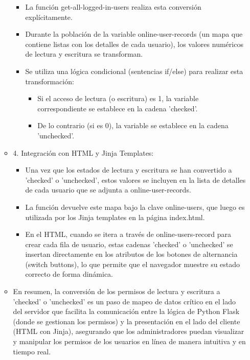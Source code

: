 \documentclass{report}
\begin{document}
\begin{itemize}
\begin{itemize}
\begin{itemize}
                \item La función get-all-logged-in-users realiza esta conversión explícitamente.
                \item Durante la población de la variable online-user-records (un mapa que contiene listas con los detalles de cada usuario), los valores 
                numéricos de lectura y escritura se transforman.
                \item Se utiliza una lógica condicional (sentencias if/else) para realizar esta transformación:
                    \begin{itemize}
                        \item Si el acceso de lectura (o escritura) es 1, la variable correspondiente se establece en la cadena 'checked'.
                        \item De lo contrario (si es 0), la variable se establece en la cadena 'unchecked'.
                    \end{itemize}
            \end{itemize}
        \item 4. Integración con HTML y Jinja Templates:
            \begin{itemize}
                \item Una vez que los estados de lectura y escritura se han convertido a 'checked' o 'unchecked', estos valores se incluyen en la lista de 
                detalles de cada usuario que se adjunta a online-user-records.
                \item La función devuelve este mapa bajo la clave online-users, que luego es utilizada por los Jinja templates en la página index.html.
                \item En el HTML, cuando se itera a través de online-users-record para crear cada fila de usuario, estas cadenas 'checked' o 'unchecked' 
                se insertan directamente en los atributos de los botones de alternancia (switch buttons), lo que permite que el navegador muestre su estado 
                correcto de forma dinámica.
            \end{itemize}
        \item En resumen, la conversión de los permisos de lectura y escritura a 'checked' o 'unchecked' es un paso de mapeo de datos crítico en el lado del 
        servidor que facilita la comunicación entre la lógica de Python Flask (donde se gestionan los permisos) y la presentación en el lado del cliente 
        (HTML con Jinja), asegurando que los administradores puedan visualizar y manipular los permisos de los usuarios en línea de manera intuitiva y en 
        tiempo real.
    \end{itemize}


\end{itemize}
\end{document}
